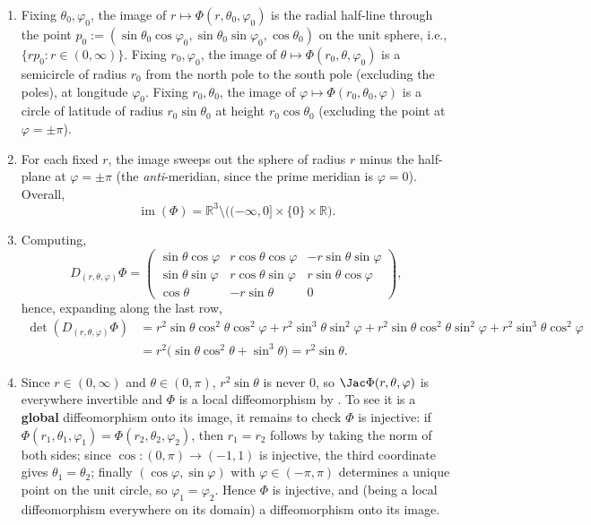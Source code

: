 \begin{exercisesolution}
\label{sol:spherical_coordinates_diffeomorphism}
\begin{enumerate}[label=\textbf{(\alph*)}]
  \item Fixing $\theta_0,\varphi_0$, the image of $r \mapsto \Phi(r,\theta_0,\varphi_0)$ is the
    radial half-line through the point $p_0 := (\sin\theta_0\cos\varphi_0,
    \sin\theta_0\sin\varphi_0, \cos\theta_0)$ on the unit sphere, i.e., $\{rp_0 : r \in
    (0,\infty)\}$. Fixing $r_0,\varphi_0$, the image of $\theta \mapsto \Phi(r_0,\theta,\varphi_0)$
    is a semicircle of radius $r_0$ from the north pole to the south pole (excluding the poles),
    at longitude $\varphi_0$. Fixing $r_0,\theta_0$, the image of $\varphi \mapsto
    \Phi(r_0,\theta_0,\varphi)$ is a circle of latitude of radius $r_0\sin\theta_0$ at height
    $r_0\cos\theta_0$ (excluding the point at $\varphi = \pm\pi$).
  \item For each fixed $r$, the image sweeps out the sphere of radius $r$ minus the half-plane
    at $\varphi = \pm\pi$ (the \emph{anti}-meridian, since the prime meridian is $\varphi = 0$).
    Overall,
    \[\operatorname{im}(\Phi) = \mathbb{R}^3\setminus\big((-\infty,0]\times\{0\}\times\mathbb{R}\big).\]
  \item Computing,
    \[D_{(r,\theta,\varphi)}\Phi = \begin{pmatrix} \sin\theta\cos\varphi & r\cos\theta\cos\varphi & -r\sin\theta\sin\varphi \\ \sin\theta\sin\varphi & r\cos\theta\sin\varphi & r\sin\theta\cos\varphi \\ \cos\theta & -r\sin\theta & 0 \end{pmatrix},\]
    hence, expanding along the last row,
    \[\begin{aligned}
    \det(D_{(r,\theta,\varphi)}\Phi) &= r^2\sin\theta\cos^2\theta\cos^2\varphi+r^2\sin^3\theta\sin^2\varphi+r^2\sin\theta\cos^2\theta\sin^2\varphi+r^2\sin^3\theta\cos^2\varphi \\
    &= r^2\big(\sin\theta\cos^2\theta+\sin^3\theta\big) = r^2\sin\theta.
    \end{aligned}\]
  \item Since $r \in (0,\infty)$ and $\theta \in (0,\pi)$, $r^2\sin\theta$ is never $0$, so
    $\Jac\Phi(r,\theta,\varphi)$ is everywhere invertible and $\Phi$ is a local diffeomorphism by
    . To see it is a \textbf{global} diffeomorphism onto its
    image, it remains to check $\Phi$ is injective: if $\Phi(r_1,\theta_1,\varphi_1) =
    \Phi(r_2,\theta_2,\varphi_2)$, then $r_1=r_2$ follows by taking the norm of both sides; since
    $\cos : (0,\pi) \to (-1,1)$ is injective, the third coordinate gives $\theta_1=\theta_2$;
    finally $(\cos\varphi,\sin\varphi)$ with $\varphi \in (-\pi,\pi)$ determines a unique point on
    the unit circle, so $\varphi_1=\varphi_2$. Hence $\Phi$ is injective, and (being a local
    diffeomorphism everywhere on its domain) a diffeomorphism onto its image.
\end{enumerate}
\end{exercisesolution}


